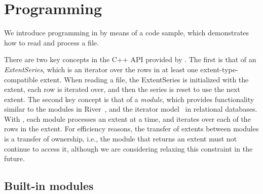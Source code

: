 \section{Programming}\label{sec:programming}

We introduce programming in \DataSeries{} by means of a code sample,
which demonstrates how to read and process a \DataSeries{} file.  

There are two key concepts in the C++ API provided by \DataSeries{}. The
first is that of an \textit{ExtentSeries}, which is an iterator over
the rows in at least one extent-type-compatible 
extent.  When reading a
file, the ExtentSeries is initialized with the extent, each row is
iterated over, and then the series is reset to use the next extent.
The second key concept is that of a \textit{module}, which
provides functionality similar to the modules in
River~\cite{river99}, and the iterator model~\cite{graefeQueryProcessing93} in relational
databases.  With \DataSeries{}, each module processes
an extent at a time, and iterates over each of the rows in the extent.
For efficiency reasons, the transfer of extents
between modules is a transfer of ownership, i.e., the module that returns an
extent must not continue to access it, although we are considering
relaxing this constraint in the future.  

\subsection{Built-in modules}

